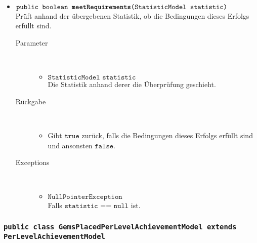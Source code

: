 \begin{description}
\begin{itemize}
		\item $\texttt{public boolean \textbf{meetRequirements}(StatisticModel statistic)}$ \\ Prüft anhand der übergebenen Statistik, ob die Bedingungen dieses Erfolgs erfüllt sind.
		\begin{description}
		\item[Parameter] \hfill \\
			\vspace{-.8cm}
			\begin{itemize}
				\item $\texttt{StatisticModel statistic}$ \\ Die Statistik anhand derer die Überprüfung geschieht. 
			\end{itemize}
			\item[Rückgabe] \hfill \\
			\vspace{-.8cm}
			\begin{itemize}
				\item Gibt $\texttt{true}$ zurück, falls die Bedingungen dieses Erfolgs erfüllt sind und ansonsten $\texttt{false}$.
			\end{itemize}
			\item[Exceptions] \hfill \\
			\vspace{-.8cm}
			\begin{itemize}
				\item $\texttt{NullPointerException}$ \\ Falls $\texttt{statistic == null}$ ist.
			\end{itemize}
		\end{description}
	\end{itemize}
\end{description}

\subsubsection{\normalfont \texttt{public class \textbf{GemsPlacedPerLevelAchievementModel} extends PerLevelAchievementModel}}

